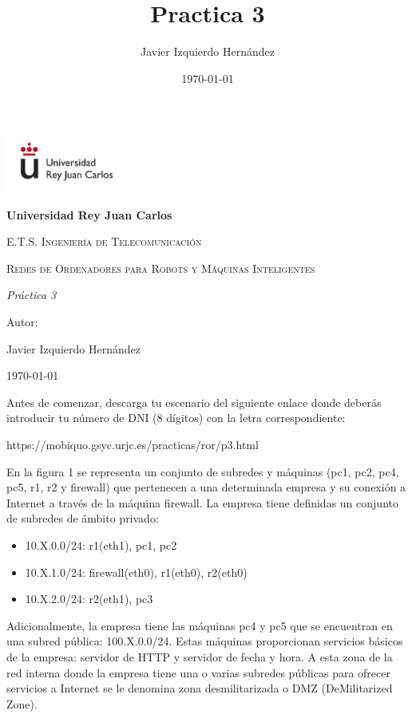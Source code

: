 \documentclass[12pt, a4paper]{report}
\title{Practica 3}
\author{Javier Izquierdo Hernández}
\date{\today}
\begin{document}
	\begin{titlepage}
		\centering
		{\includegraphics[width=0.3\textwidth]{logo}\par}
		\vspace{1cm}
		{\bfseries\LARGE Universidad Rey Juan Carlos \par}
		\vspace{1cm}
		{\scshape\Large E.T.S. Ingeniería de Telecomunicación \par}
		\vspace{3cm}
		{\scshape\Huge Redes de Ordenadores para Robots y Máquinas Inteligentes \par}
		\vspace{3cm}
		{\itshape\Large Práctica 3 \par}
		\vfill
		{\Large Autor: \par}
		{\Large Javier Izquierdo Hernández \par}
		\vfill
		{\Large \today \par}
	\end{titlepage}

\newpage
\renewcommand{\contentsname}{Contenidos}
\tableofcontents
\newpage

Antes de comenzar, descarga tu escenario del siguiente enlace donde deberás introducir tu número
de DNI (8 dígitos) con la letra correspondiente:\\
\begin{center}
https://mobiquo.gsyc.urjc.es/practicas/ror/p3.html	
\end{center}

En la figura 1 se representa un conjunto de subredes y máquinas (pc1, pc2, pc4, pc5, r1, r2 y
firewall) que pertenecen a una determinada empresa y su conexión a Internet a través de la máquina
firewall. La empresa tiene definidas un conjunto de subredes de ámbito privado:\\
\begin{itemize}
	\item 10.X.0.0/24: r1(eth1), pc1, pc2
	\item 10.X.1.0/24: firewall(eth0), r1(eth0), r2(eth0)
	\item 10.X.2.0/24: r2(eth1), pc3
\end{itemize}

Adicionalmente, la empresa tiene las máquinas pc4 y pc5 que se encuentran en una subred pública: 100.X.0.0/24. Estas máquinas proporcionan servicios básicos de la empresa: servidor de HTTP y
servidor de fecha y hora. A esta zona de la red interna donde la empresa tiene una o varias subredes
públicas para ofrecer servicios a Internet se le denomina zona desmilitarizada o DMZ (DeMilitarized
Zone).\\
\end{document}
